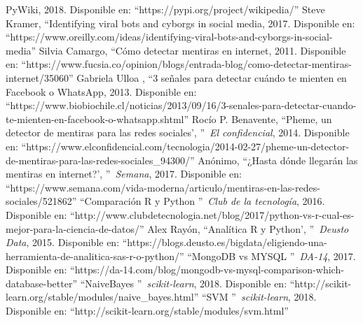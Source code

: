 \documentclass[../all.tex]{subfiles}
\begin{document}
\begin{thebibliography}{37}
		PyWiki,
		2018.
		Disponible en: ``https://pypi.org/project/wikipedia/''
		 Steve Kramer, 
		\textquotedblleft Identifying viral bots and cyborgs in social media,
		2017.
		Disponible en: ``https://www.oreilly.com/ideas/identifying-viral-bots-and-cyborgs-in-social-media''
		Silvia Camargo, 
		\textquotedblleft Cómo detectar mentiras en internet,
		2011.
		Disponible en: ``https://www.fucsia.co/opinion/blogs/entrada-blog/como-detectar-mentiras-internet/35060''
		Gabriela Ulloa , 
		\textquotedblleft 3 señales para detectar cuándo te mienten en Facebook o WhatsApp,
		2013.
		Disponible en: ``https://www.biobiochile.cl/noticias/2013/09/16/3-senales-para-detectar-cuando-te-mienten-en-facebook-o-whatsapp.shtml''
		Rocío P. Benavente, 
		\textquotedblleft Pheme, un detector de mentiras para las redes sociales',
		\textquotedblright\ \textit{El confidencial},
		2014.
		Disponible en: ``https://www.elconfidencial.com/tecnologia/2014-02-27/pheme-un-detector-de-mentiras-para-las-redes-sociales\_94300/''
		Anónimo, 
		\textquotedblleft ¿Hasta dónde llegarán las mentiras en internet?',
		\textquotedblright\ \textit{Semana},
		2017.
		Disponible en: ``https://www.semana.com/vida-moderna/articulo/mentiras-en-las-redes-sociales/521862''
			\textquotedblleft Comparación R y Python
			\textquotedblright\, \textit{Club de la tecnología},
			2016.
			Disponible en: ``http://www.clubdetecnologia.net/blog/2017/python-vs-r-cual-es-mejor-para-la-ciencia-de-datos/''
			Alex Rayón, 
			\textquotedblleft Analítica R y Python',
			\textquotedblright\ \textit{Deusto Data},
			2015.
			Disponible en: ``https://blogs.deusto.es/bigdata/eligiendo-una-herramienta-de-analitica-sas-r-o-python/''
			\textquotedblleft MongoDB vs MYSQL
			\textquotedblright\, \textit{DA-14},
			2017.
			Disponible en: ``https://da-14.com/blog/mongodb-vs-mysql-comparison-which-database-better''
			\textquotedblleft NaiveBayes
			\textquotedblright\, \textit{scikit-learn},
			2018.
			Disponible en: ``http://scikit-learn.org/stable/modules/naive\_bayes.html''
			\textquotedblleft SVM
			\textquotedblright\, \textit{scikit-learn},
			2018.
			Disponible en: ``http://scikit-learn.org/stable/modules/svm.html''
			

\end{thebibliography}
\end{document}
